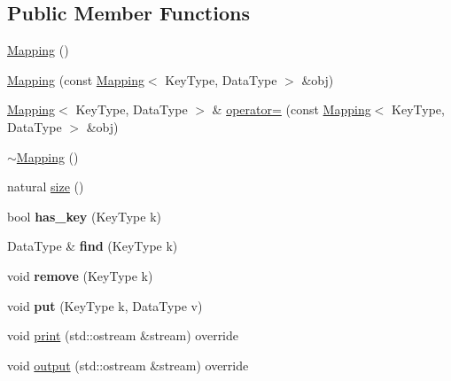 \subsection*{Public Member Functions}
\begin{DoxyCompactItemize}
\item 
\hyperlink{classez_1_1objects_1_1Mapping_a12a266ba49d22f9a382a4cc916253284}{Mapping} ()
\item 
\hyperlink{classez_1_1objects_1_1Mapping_a2e01d47b23e082e6aade1923fede999d}{Mapping} (const \hyperlink{classez_1_1objects_1_1Mapping}{Mapping}$<$ Key\+Type, Data\+Type $>$ \&obj)
\item 
\hyperlink{classez_1_1objects_1_1Mapping}{Mapping}$<$ Key\+Type, Data\+Type $>$ \& \hyperlink{classez_1_1objects_1_1Mapping_a62fd1fa4b2087fc0deaafa92aaba1c0b}{operator=} (const \hyperlink{classez_1_1objects_1_1Mapping}{Mapping}$<$ Key\+Type, Data\+Type $>$ \&obj)
\item 
\hyperlink{classez_1_1objects_1_1Mapping_af2a29688f35f5a161744c111f6ec9be0}{$\sim$\+Mapping} ()
\item 
natural \hyperlink{classez_1_1objects_1_1Mapping_a223f5d523a0f3cc3eff5dc7cbf78ce29}{size} ()
\item 
\mbox{\label{classez_1_1objects_1_1Mapping_a40d390667d1a9cce1bb00e4128800a1e}} 
bool {\bfseries has\+\_\+key} (Key\+Type k)
\item 
\mbox{\label{classez_1_1objects_1_1Mapping_addba04e486fac91d1ede7ef1af2f7c6a}} 
Data\+Type \& {\bfseries find} (Key\+Type k)
\item 
\mbox{\label{classez_1_1objects_1_1Mapping_ae018c78b91c3b6d3189d102758d180f1}} 
void {\bfseries remove} (Key\+Type k)
\item 
\mbox{\label{classez_1_1objects_1_1Mapping_a085397df2df6e39e2a144fc6e583a309}} 
void {\bfseries put} (Key\+Type k, Data\+Type v)
\item 
void \hyperlink{classez_1_1objects_1_1Mapping_ac30b4bf58f51ea49c8422dfce1e6cf15}{print} (std\+::ostream \&stream) override
\item 
void \hyperlink{classez_1_1objects_1_1Mapping_a1233daf5c8f5d7ad9539e9d7f58703c3}{output} (std\+::ostream \&stream) override
\item 

\end{DoxyCompactItemize}
